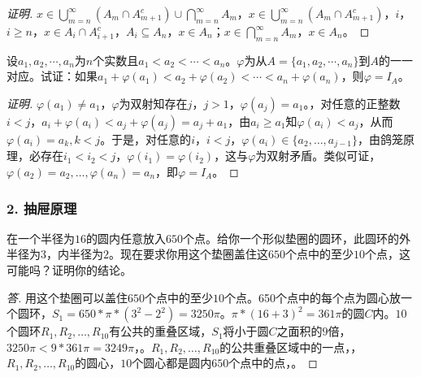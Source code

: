 \documentclass{beamer}
\begin{document}
\begin{CJK*}{UTF8}{gbsn}
\begin{frame}
\begin{proof}[证明]
      $x\in  \bigcup_{m=n}^{\infty}(A_m\cap A_{m+1}^c)\cup \bigcap_{m=n}^{\infty}A_m$，$x\in \bigcup_{m=n}^{\infty}(A_m\cap A_{m+1}^c)$，$i$，$i\geq n$，$x\in A_i\cap A_{i+1}^c$，$A_i\subseteq A_n$，$x\in A_n$；$x\in \bigcap_{m=n}^{\infty}A_m$，$x\in A_n$。
  \end{proof}
  \end{frame}
\begin{frame}
  \begin{Ex}
    设$a_1, a_2, \cdots, a_n$为$n$个实数且$a_1<a_2<\cdots <a_n$。$\varphi$为从$A=\{a_1,a_2,\cdots,a_n\}$到$A$的一一对应。试证：如果$a_1+\varphi(a_1)<a_2+\varphi(a_2)<\cdots < a_n+\varphi(a_n)$，则$\varphi = I_A$。
  \end{Ex}
  \pause
  \begin{proof}[证明]
    $\varphi(a_1)\neq a_1$，$\varphi$为双射知存在$j$，\pause $j>1$，\pause $\varphi(a_j)=a_1$。，\pause 对任意的正整数$i<j$，\pause $a_i+\varphi(a_i)<a_j+\varphi(a_j)=a_j+a_1$，\pause 由$a_i\geq a_1$知$\varphi(a_i)< a_j$，\pause 从而$\varphi(a_i)=a_k,k<j$。\pause 于是，\pause 对任意的$i$，\pause $i<j$，\pause $\varphi(a_i)\in \{a_2,\ldots,a_{j-1}\}$，\pause 由鸽笼原理，\pause 必存在$i_1<i_2<j$，\pause $\varphi(i_1)=\varphi(i_2)$，\pause 这与$\varphi$为双射矛盾。\pause 类似可证，\pause $\varphi(a_2)=a_2,\ldots,\varphi(a_n)=a_n$，\pause 即$\varphi = I_A$。
  \end{proof}  
\end{frame}  
\begin{frame}
  \frametitle{2. 抽屉原理}
  \begin{Exercise}
    在一个半径为$16$的圆内任意放入$650$个点。给你一个形似垫圈的圆环，此圆环的外半径为$3$，内半径为$2$。现在要求你用这个垫圈盖住这$650$个点中的至少$10$个点，这可能吗？证明你的结论。
  \end{Exercise}
  \pause
  \begin{proof}[答]
    \pause 用这个垫圈可以盖住$650$个点中的至少$10$个点。650个点中的每个点为圆心放一个圆环，$S_1 = 650 * \pi * (3^2 - 2^2) = 3250\pi$。$\pi * (16 + 3)^2= 361\pi$的圆$C$内。$10$个圆环$R_1,R_2,\ldots, R_{10}$有公共的重叠区域，$S_1$将小于圆$C$之面积的$9$倍，$3250\pi < 9 * 361\pi = 3249\pi$，。$R_1,R_2,\ldots, R_{10}$的公共重叠区域中的一点，，$R_1,R_2,\ldots,R_{10}$的圆心，$10$个圆心都是圆内$650$个点中的点，。 
  \end{proof}
\end{frame}

\end{CJK*}
\end{document}
